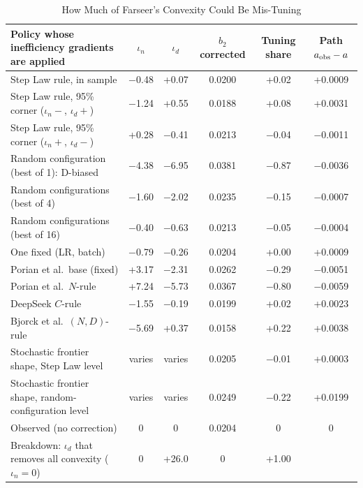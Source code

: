 \begin{table}[tp]
\centering
\caption{How Much of Farseer's Convexity Could Be Mis-Tuning}
\label{tab:sigmaC-tuning}
\footnotesize
\setlength{\tabcolsep}{3pt}
\begin{tabular*}{\textwidth}{@{\extracolsep{\fill}}>{\raggedright\arraybackslash}p{}ccccc@{}}
\toprule
Policy whose inefficiency gradients are applied & $\iota_n$ & $\iota_d$ & $b_2$ corrected & Tuning share & Path $a_{\rm obs}-a$ \\
\midrule
Step Law rule, in sample & $-$0.48 & +0.07 & 0.0200 & +0.02 & +0.0009 \\
Step Law rule, 95\% corner ($\iota_n-$, $\iota_d+$) & $-$1.24 & +0.55 & 0.0188 & +0.08 & +0.0031 \\
Step Law rule, 95\% corner ($\iota_n+$, $\iota_d-$) & +0.28 & $-$0.41 & 0.0213 & $-$0.04 & $-$0.0011 \\
Random configuration (best of 1): D-biased & $-$4.38 & $-$6.95 & 0.0381 & $-$0.87 & $-$0.0036 \\
Random configurations (best of 4) & $-$1.60 & $-$2.02 & 0.0235 & $-$0.15 & $-$0.0007 \\
Random configurations (best of 16) & $-$0.40 & $-$0.63 & 0.0213 & $-$0.05 & $-$0.0004 \\
One fixed (LR, batch) & $-$0.79 & $-$0.26 & 0.0204 & +0.00 & +0.0009 \\
Porian et al.\ base (fixed) & +3.17 & $-$2.31 & 0.0262 & $-$0.29 & $-$0.0051 \\
Porian et al.\ $N$-rule & +7.24 & $-$5.73 & 0.0367 & $-$0.80 & $-$0.0059 \\
DeepSeek $C$-rule & $-$1.55 & $-$0.19 & 0.0199 & +0.02 & +0.0023 \\
Bjorck et al.\ $(N,D)$-rule & $-$5.69 & +0.37 & 0.0158 & +0.22 & +0.0038 \\
Stochastic frontier shape, Step Law level & varies & varies & 0.0205 & $-$0.01 & +0.0003 \\
Stochastic frontier shape, random-configuration level & varies & varies & 0.0249 & $-$0.22 & +0.0199 \\
\addlinespace
Observed (no correction) & 0 & 0 & 0.0204 & 0 & 0 \\
Breakdown: $\iota_d$ that removes all convexity ($\iota_n=0$) & 0 & +26.0 & 0 & +1.00 & \\
\bottomrule
\end{tabular*}


\end{table}

